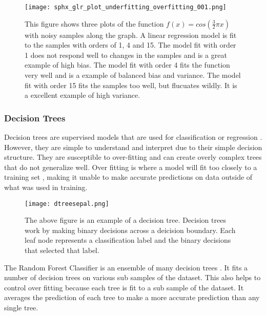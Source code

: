 \begin{figure}[htp]
    \centering
    \texttt{[image: sphx\_glr\_plot\_underfitting\_overfitting\_001.png]}
    \caption{This figure shows three plots of the function \( f(x) = cos(\frac{3}{2} \pi x)\) with noisy samples along the graph. 
    A linear regression model is fit to the samples with orders of 1, 4 and 15.
    The model fit with order 1 does not respond well to changes in the samples and is a great example of high bias.
    The model fit with order 4 fits the function very well and is a example of balanced bias and variance.
    The model fit with order 15 fits the samples too well, but flucuates wildly. 
    It is a excellent example of high variance.}
    \label{}
\end{figure}

\subsubsection{Decision Trees}
Decision trees are supervised models that are used for classification or regression \cite{breiman2017classification}.
However, they are simple to understand and interpret due to their simple decision structure. 
They are susceptible to over-fitting and can create overly complex trees that do not generalize well.
Over fitting is where a model will fit too closely to a training set \cite{cawley2010over}, making it unable to make accurate predictions on data outside of what was used in training.

\begin{figure}[htp]
    \centering
    \texttt{[image: dtreesepal.png]}
    \caption{The above figure is an example of a decision tree. Decision trees work by making binary decisions across a deicision boundary.
    Each leaf node represents a classification label and the binary decisions that selected that label.}
    \label{}
\end{figure}

\par
The Random Forest Classifier is an ensemble of many decision trees \cite{breiman2001random}.
It fits a number of decision trees on various sub samples of the dataset.
This also helps to control over fitting because each tree is fit to a sub sample of the dataset.
It averages the prediction of each tree to make a more accurate prediction than any single tree.


